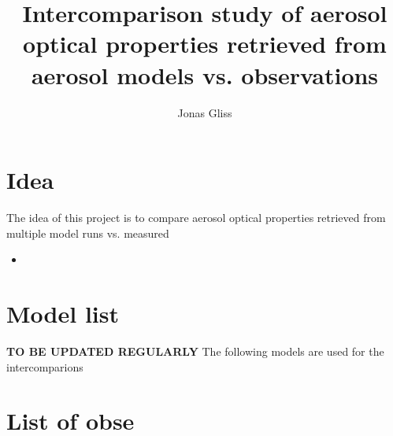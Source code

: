 \documentclass[]{scrartcl}
\title{Intercomparison study of aerosol optical properties retrieved from aerosol models vs. observations}
\author{Jonas Gliss}
\begin{document}
\maketitle

\begin{abstract}

\end{abstract}

\section{Idea}
The idea of this project is to compare aerosol optical properties retrieved from multiple model runs vs. measured

\begin{itemize}
	\item 
\end{itemize}


\section{Model list}
\textbf{TO BE UPDATED REGULARLY}
The following models are used for the intercomparions

\section{List of obse}
\end{document}
